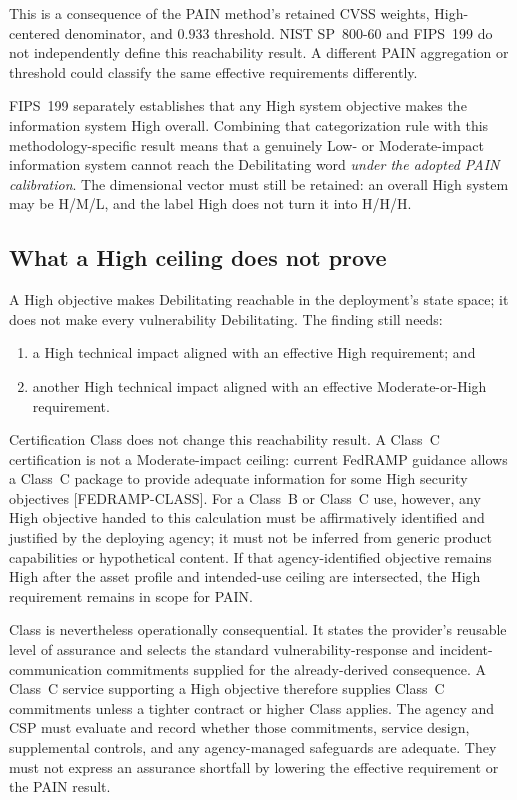 \documentclass[11pt]{article}
\begin{document}
\begin{cautionbox}
This is a consequence of the PAIN method's retained CVSS weights,
High-centered denominator, and $0.933$ threshold. NIST SP~800-60 and FIPS~199 do
not independently define this reachability result. A different PAIN aggregation
or threshold could classify the same effective requirements differently.
\end{cautionbox}

FIPS~199 separately establishes that any High system objective makes the
information system High overall. Combining that categorization rule with this
methodology-specific result means that a genuinely Low- or Moderate-impact
information system cannot reach the Debilitating word \emph{under the adopted PAIN
calibration}. The dimensional vector must still be retained: an overall High
system may be H/M/L, and the label High does not turn it into H/H/H.

\subsection{What a High ceiling does not prove}

A High objective makes Debilitating reachable in the deployment's state space; it
does not make every vulnerability Debilitating. The finding still needs:

\begin{enumerate}[leftmargin=1.7em]
\item a High technical impact aligned with an effective High requirement; and
\item another High technical impact aligned with an effective Moderate-or-High
  requirement.
\end{enumerate}

Certification Class does not change this reachability result. A Class~C
certification is not a Moderate-impact ceiling: current FedRAMP guidance allows a
Class~C package to provide adequate information for some High security objectives
\mbox{[FEDRAMP-CLASS]}. For a Class~B or Class~C use, however, any High objective handed
to this calculation must be affirmatively identified and justified by the deploying
agency; it must not be inferred from generic product capabilities or hypothetical
content. If that agency-identified objective remains High after the asset profile
and intended-use ceiling are intersected, the High requirement remains in scope for
PAIN.

Class is nevertheless operationally consequential. It states the provider's
reusable level of assurance and selects the standard vulnerability-response and
incident-communication commitments supplied for the already-derived consequence.
A Class~C service supporting a High objective therefore supplies Class~C
commitments unless a tighter contract or higher Class applies. The agency and CSP
must evaluate and record whether those commitments, service design, supplemental
controls, and any agency-managed safeguards are adequate. They must not express an
assurance shortfall by lowering the effective requirement or the PAIN result.
\end{document}
